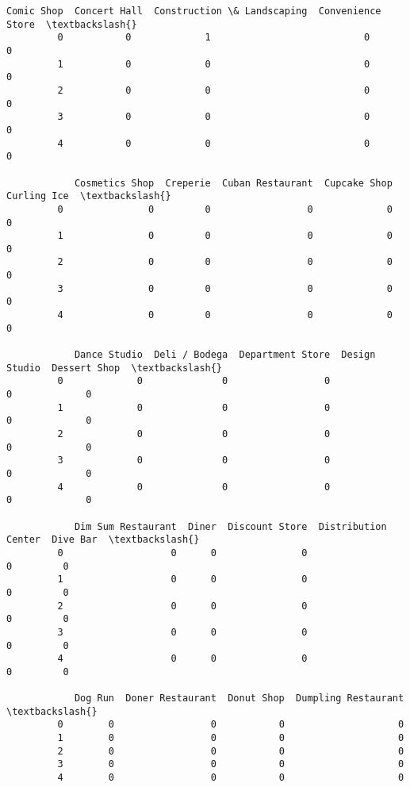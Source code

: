 \documentclass[11pt]{article}
\begin{document}
\begin{Verbatim}[commandchars=\\\{\}]
            Comic Shop  Concert Hall  Construction \& Landscaping  Convenience Store  \textbackslash{}
         0           0             1                           0                  0   
         1           0             0                           0                  0   
         2           0             0                           0                  0   
         3           0             0                           0                  0   
         4           0             0                           0                  0   
         
            Cosmetics Shop  Creperie  Cuban Restaurant  Cupcake Shop  Curling Ice  \textbackslash{}
         0               0         0                 0             0            0   
         1               0         0                 0             0            0   
         2               0         0                 0             0            0   
         3               0         0                 0             0            0   
         4               0         0                 0             0            0   
         
            Dance Studio  Deli / Bodega  Department Store  Design Studio  Dessert Shop  \textbackslash{}
         0             0              0                 0              0             0   
         1             0              0                 0              0             0   
         2             0              0                 0              0             0   
         3             0              0                 0              0             0   
         4             0              0                 0              0             0   
         
            Dim Sum Restaurant  Diner  Discount Store  Distribution Center  Dive Bar  \textbackslash{}
         0                   0      0               0                    0         0   
         1                   0      0               0                    0         0   
         2                   0      0               0                    0         0   
         3                   0      0               0                    0         0   
         4                   0      0               0                    0         0   
         
            Dog Run  Doner Restaurant  Donut Shop  Dumpling Restaurant  \textbackslash{}
         0        0                 0           0                    0   
         1        0                 0           0                    0   
         2        0                 0           0                    0   
         3        0                 0           0                    0   
         4        0                 0           0                    0   
         

\end{Verbatim}
\end{document}
